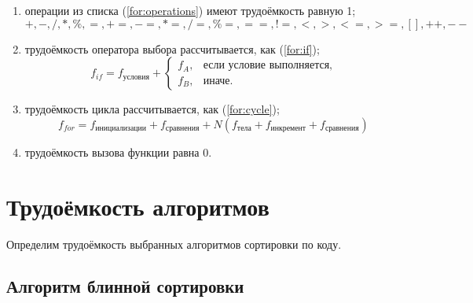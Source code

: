 \begin{enumerate}
	\item операции из списка (\ref{for:operations}) имеют трудоёмкость равную 1;
	\begin{equation}
		\label{for:operations}
		+, -, /, *, \%, =, +=, -=, *=, /=, \%=, ==, !=, <, >, <=, >=, [], ++, {-}-
	\end{equation}
	\item трудоёмкость оператора выбора  рассчитывается, как (\ref{for:if});
	\begin{equation}
		\label{for:if}
		f_{if} = f_{\text{условия}} +
		\begin{cases}
			f_A, & \text{если условие выполняется,}\\
			f_B, & \text{иначе.}
		\end{cases}
	\end{equation}
	\item трудоёмкость цикла рассчитывается, как (\ref{for:cycle});
	\begin{equation}
		\label{for:cycle}
		f_{for} = f_{\text{инициализации}} + f_{\text{сравнения}} + N(f_{\text{тела}} + f_{\text{инкремент}} + f_{\text{сравнения}})
	\end{equation}
	\item трудоёмкость вызова функции равна 0.
\end{enumerate}


\section{Трудоёмкость алгоритмов}

Определим трудоёмкость выбранных алгоритмов сортировки по коду.

\subsection{Алгоритм блинной сортировки}

